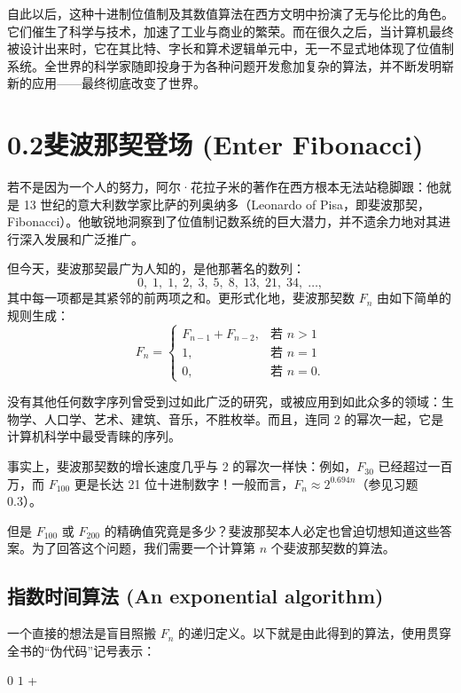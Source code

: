 自此以后，这种十进制位值制及其数值算法在西方文明中扮演了无与伦比的角色。它们催生了科学与技术，加速了工业与商业的繁荣。而在很久之后，当计算机最终被设计出来时，它在其比特、字长和算术逻辑单元中，无一不显式地体现了位值制系统。全世界的科学家随即投身于为各种问题开发愈加复杂的算法，并不断发明崭新的应用——最终彻底改变了世界。

\section*{0.2\quad 斐波那契登场 (Enter Fibonacci)}

若不是因为一个人的努力，阿尔·花拉子米的著作在西方根本无法站稳脚跟：他就是 13 世纪的意大利数学家比萨的列奥纳多（Leonardo of Pisa，即斐波那契，Fibonacci）。他敏锐地洞察到了位值制记数系统的巨大潜力，并不遗余力地对其进行深入发展和广泛推广。

但今天，斐波那契最广为人知的，是他那著名的数列：
\[
0,\; 1,\; 1,\; 2,\; 3,\; 5,\; 8,\; 13,\; 21,\; 34,\; \dots,
\]
其中每一项都是其紧邻的前两项之和。更形式化地，斐波那契数 $F_n$ 由如下简单的规则生成：
\[
F_n = \begin{cases}
F_{n-1} + F_{n-2}, & \text{若 } n > 1 \\
1, & \text{若 } n = 1 \\
0, & \text{若 } n = 0.
\end{cases}
\]

没有其他任何数字序列曾受到过如此广泛的研究，或被应用到如此众多的领域：生物学、人口学、艺术、建筑、音乐，不胜枚举。而且，连同 2 的幂次一起，它是计算机科学中最受青睐的序列。

事实上，斐波那契数的增长速度几乎与 2 的幂次一样快：例如，$F_{30}$ 已经超过一百万，而 $F_{100}$ 更是长达 21 位十进制数字！一般而言，$F_n \approx 2^{0.694n}$（参见习题 0.3）。

但是 $F_{100}$ 或 $F_{200}$ 的精确值究竟是多少？斐波那契本人必定也曾迫切想知道这些答案。为了回答这个问题，我们需要一个计算第 $n$ 个斐波那契数的算法。

\subsection*{指数时间算法 (An exponential algorithm)}

一个直接的想法是盲目照搬 $F_n$ 的递归定义。以下就是由此得到的算法，使用贯穿全书的“伪代码”记号表示：

\begin{tcolorbox}[colback=white,colframe=gray!50!black,title={\textbf{算法}\quad \texttt{fib1}}]
\begin{algorithmic}[1]
     \Return $0$ \EndIf
     \Return $1$ \EndIf
    \State \Return {} + 
\EndFunction
\end{algorithmic}
\end{tcolorbox}


